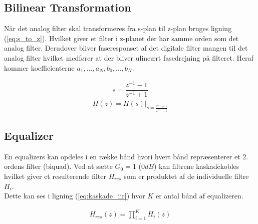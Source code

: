     \subsection{Bilinear Transformation}
    Når det analog filter skal transformeres fra s-plan til z-plan bruges ligning (\ref{eq:s_to_z}). Hvilket giver et 
    filter i z-planet der har samme orden som det analog filter. Derudover bliver faseresponset af det digitale filter mangen til 
    det analog filter hvilket medfører at der bliver ulineært fasedrejning på filteret. 
    Heraf kommer koefficienterne $a_1, \dots, a_N, b_0,\dots, b_N $. 
  
    \begin{align}
    s = \dfrac{z^{-1} - 1}{z^{-1} + 1}  
    \label{eq:s_to_z}
    \end{align}
    \begin{align}
    H(z) = H(s)\big|_{s = \frac{z^{-1} - 1}{z^{-1}+ 1 }}
    \end{align}

    
   \subsection{Equalizer}

   En equalizers kan opdeles i en række bånd hvori hvert bånd repræsenterer et 
   2. ordens filter (biquad). Ved at sætte $G_0 = 1$ ($0 dB$) kan filtrene kaskadekobles hvilket giver 
   et resulterende filter $H_{res}$ som er produktet af de individuelle filtre $H_i$. \\
   Dette kan ses i ligning (\ref{eq:kaskade_iir}) hvor $K$ er antal bånd af equalizeren.  

   \begin{align}
    H_{res}(z) = \prod_{i=1}^{K} H_i(z)
    \label{eq:kaskade_iir}
   \end{align} 




 






